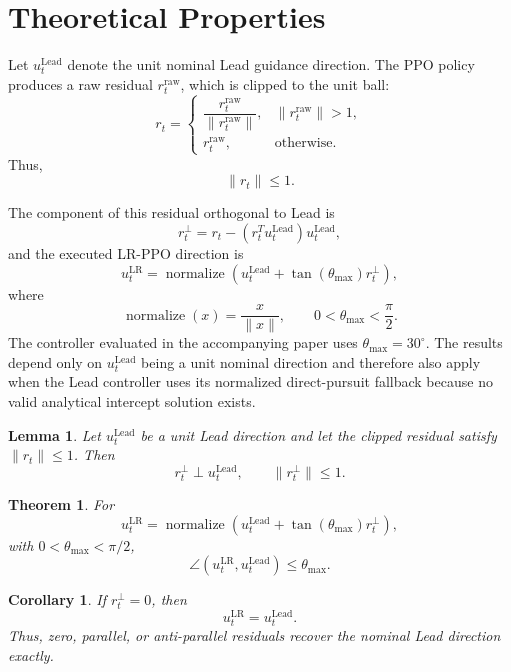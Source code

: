 \documentclass[10pt]{article}
\newtheorem{theorem}{Theorem}
\newtheorem{lemma}{Lemma}
\newtheorem{corollary}{Corollary}
\begin{document}
\section*{Theoretical Properties}
\label{sec:theoretical-results}

Let \(u_t^{\mathrm{Lead}}\) denote the unit nominal Lead guidance direction.
The PPO policy produces a raw residual \(r_t^{\mathrm{raw}}\), which is clipped
to the unit ball:
\[
r_t=
\begin{cases}
\dfrac{r_t^{\mathrm{raw}}}{\|r_t^{\mathrm{raw}}\|},
& \|r_t^{\mathrm{raw}}\|>1,\\[4pt]
r_t^{\mathrm{raw}},
& \text{otherwise}.
\end{cases}
\]
Thus,
\[
\|r_t\|\leq1.
\]

The component of this residual orthogonal to Lead is
\[
r_t^\perp
=
r_t-
\left(r_t^T u_t^{\mathrm{Lead}}\right)
u_t^{\mathrm{Lead}},
\]
and the executed LR-PPO direction is
\[
u_t^{\mathrm{LR}}
=
\operatorname{normalize}
\left(
u_t^{\mathrm{Lead}}
+
\tan(\theta_{\max})r_t^\perp
\right),
\]
where
\[
\operatorname{normalize}(x)
=
\frac{x}{\|x\|},
\qquad
0<\theta_{\max}<\frac{\pi}{2}.
\]
The controller evaluated in the accompanying paper uses
\(\theta_{\max}=30^\circ\).
The results depend only on \(u_t^{\mathrm{Lead}}\) being a unit nominal
direction and therefore also apply when the Lead controller uses its normalized
direct-pursuit fallback because no valid analytical intercept solution exists.

\begin{lemma}
\label{lem:orthogonal_residual}
Let \(u_t^{\mathrm{Lead}}\) be a unit Lead direction and let the clipped
residual satisfy \(\|r_t\|\leq1\). Then
\[
r_t^\perp
\perp
u_t^{\mathrm{Lead}},
\qquad
\|r_t^\perp\|\leq1.
\]
\end{lemma}

\begin{theorem}
\label{thm:angular_bound}
For
\[
u_t^{\mathrm{LR}}
=
\operatorname{normalize}
\left(
u_t^{\mathrm{Lead}}
+
\tan(\theta_{\max})r_t^\perp
\right),
\]
with \(0<\theta_{\max}<\pi/2\),
\[
\angle
\left(
u_t^{\mathrm{LR}},
u_t^{\mathrm{Lead}}
\right)
\leq
\theta_{\max}.
\]
\end{theorem}

\begin{corollary}
\label{cor:lead_recovery}
If \(r_t^\perp=0\), then
\[
u_t^{\mathrm{LR}}
=
u_t^{\mathrm{Lead}}.
\]
Thus, zero, parallel, or anti-parallel residuals recover the nominal Lead
direction exactly.
\end{corollary}
\end{document}

